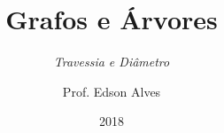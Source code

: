 \title{Grafos e Árvores}
\subtitle{\textit{Travessia e Diâmetro}}
\date{2018}
\author{Prof. Edson Alves}
